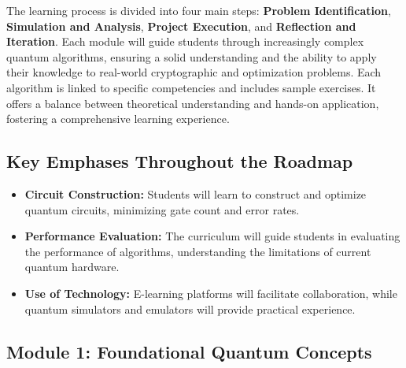 The learning process is divided into four main steps: \textbf{Problem Identification}, \textbf{Simulation and Analysis}, 
\textbf{Project Execution}, and \textbf{Reflection and Iteration}. 
Each module will guide students through increasingly complex quantum algorithms, ensuring a solid understanding and the 
ability to apply their knowledge to real-world cryptographic and optimization problems.
Each algorithm is linked to specific competencies and includes sample exercises. 
It offers a balance between theoretical understanding and hands-on application, fostering a comprehensive learning experience.

\subsection{Key Emphases Throughout the Roadmap}
\begin{itemize}
    \item \textbf{Circuit Construction:} Students will learn to construct and optimize quantum circuits, minimizing gate count and error rates.
    \item \textbf{Performance Evaluation:} The curriculum will guide students in evaluating the performance of algorithms, understanding the limitations of current quantum hardware.
    \item \textbf{Use of Technology:} E-learning platforms will facilitate collaboration, while quantum simulators and emulators will provide practical experience.
\end{itemize}

\subsection{Module 1: Foundational Quantum Concepts}

